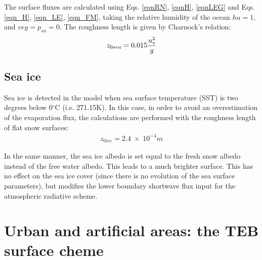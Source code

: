 The surface fluxes are calculated using Eqs. \ref{eqnRN}, \ref{eqnH},
\ref{eqnLEG} and
Eqs. \ref{eqn_H}, \ref{eqn_LE}, \ref{eqn_FM},
taking the relative humidity of the ocean $hu=1$, and
$veg=p_{sn}=0$.
The roughness length is given by Charnock's relation:
\begin{eqnarray}
z_{0sea} = 0.015 {u^2_* \over g}
\end{eqnarray}

\subsection{Sea ice}

Sea ice is detected in the model when sea surface temperature (SST) is
two degrees below 0$^\circ$C (i.e. 271.15K). In this case, in order
to avoid an overestimation of the evaporation flux, the calculations
are performed with the roughness length of flat snow surfaces:
\begin{eqnarray}
z_{0ice} = 2.4 \; \times \; 10^{-4} m
\end{eqnarray}

In the same manner, the sea ice albedo is set equal to the fresh snow
albedo instead of the free water albedo. This leads to a much brighter
surface. This has no effect on the sea ice cover (since there is no evolution
of the sea surface parameters), but modifies the lower boundary shortwave flux
input for the atmospheric radiative scheme.

\clearpage
\section{Urban and artificial areas: the TEB surface cheme}

